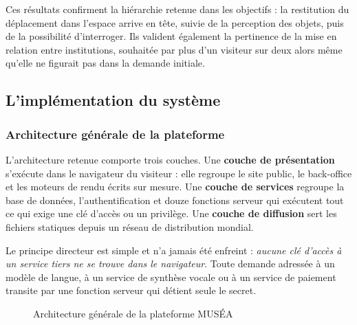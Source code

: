 Ces résultats confirment la hiérarchie retenue dans les objectifs : la
restitution du déplacement dans l'espace arrive en tête, suivie de la perception
des objets, puis de la possibilité d'interroger. Ils valident également la
pertinence de la mise en relation entre institutions, souhaitée par plus d'un
visiteur sur deux alors même qu'elle ne figurait pas dans la demande initiale.

\subsection{L'implémentation du système}
\label{sec:implementation}

\subsubsection{Architecture générale de la plateforme}

L'architecture retenue comporte trois couches. Une \textbf{couche de
présentation} s'exécute dans le navigateur du visiteur : elle regroupe le site
public, le back-office et les moteurs de rendu écrits sur mesure. Une
\textbf{couche de services} regroupe la base de données, l'authentification et
douze fonctions serveur qui exécutent tout ce qui exige une clé d'accès ou un
privilège. Une \textbf{couche de diffusion} sert les fichiers statiques depuis
un réseau de distribution mondial.

Le principe directeur est simple et n'a jamais été enfreint : \emph{aucune clé
d'accès à un service tiers ne se trouve dans le navigateur}. Toute demande
adressée à un modèle de langue, à un service de synthèse vocale ou à un service
de paiement transite par une fonction serveur qui détient seule le secret.

\begin{figure}[htbp]
\centering
{}
\caption{Architecture générale de la plateforme MUSÉA}
\label{fig:archi}
\end{figure}

